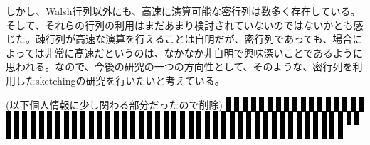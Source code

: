 \documentclass[10pt]{article}
\begin{document}
しかし、Walsh行列以外にも、高速に演算可能な密行列は数多く存在している。そして、それらの行列の利用はまだあまり検討されていないのではないかとも感じた。疎行列が高速な演算を行えることは自明だが、密行列であっても、場合によっては非常に高速だというのは、なかなか非自明で興味深いことであるように思われる。なので、今後の研究の一つの方向性として、そのような、密行列を利用したsketchingの研究を行いたいと考えている。

(以下個人情報に少し関わる部分だったので削除)
\colorbox{black}{--}
\colorbox{black}{--}
\colorbox{black}{--}
\colorbox{black}{--}
\colorbox{black}{--}
\colorbox{black}{--}
\colorbox{black}{--}
\colorbox{black}{--}
\colorbox{black}{--}
\colorbox{black}{--}
\colorbox{black}{--}
\colorbox{black}{--}
\colorbox{black}{--}
\colorbox{black}{--}
\colorbox{black}{--}
\colorbox{black}{--}
\colorbox{black}{--}
\colorbox{black}{--}
\colorbox{black}{--}
\colorbox{black}{--}
\colorbox{black}{--}
\colorbox{black}{--}
\colorbox{black}{--}
\colorbox{black}{--}
\colorbox{black}{--}
\colorbox{black}{--}
\colorbox{black}{--}
\colorbox{black}{--}
\colorbox{black}{--}
\colorbox{black}{--}
\colorbox{black}{--}
\colorbox{black}{--}
\colorbox{black}{--}
\colorbox{black}{--}
\colorbox{black}{--}
\colorbox{black}{--}
\colorbox{black}{--}
\colorbox{black}{--}
\colorbox{black}{--}
\colorbox{black}{--}
\colorbox{black}{--}
\colorbox{black}{--}
\colorbox{black}{--}
\colorbox{black}{--}
\colorbox{black}{--}
\colorbox{black}{--}
\colorbox{black}{--}
\colorbox{black}{--}
\colorbox{black}{--}
\colorbox{black}{--}
\colorbox{black}{--}
\colorbox{black}{--}
\colorbox{black}{--}
\colorbox{black}{--}
\colorbox{black}{--}
\colorbox{black}{--}
\colorbox{black}{--}
\colorbox{black}{--}
\colorbox{black}{--}
\colorbox{black}{--}
\colorbox{black}{--}
\colorbox{black}{--}
\colorbox{black}{--}
\colorbox{black}{--}
\colorbox{black}{--}
\colorbox{black}{--}
\colorbox{black}{--}
\colorbox{black}{--}
\colorbox{black}{--}
\colorbox{black}{--}
\colorbox{black}{--}
\colorbox{black}{--}
\colorbox{black}{--}
\colorbox{black}{--}
\colorbox{black}{--}
\colorbox{black}{--}
\colorbox{black}{--}
\colorbox{black}{--}
\colorbox{black}{--}
\colorbox{black}{--}
\colorbox{black}{--}
\colorbox{black}{--}
\colorbox{black}{--}
\colorbox{black}{--}
\colorbox{black}{--}
\colorbox{black}{--}
\colorbox{black}{--}
\colorbox{black}{--}
\colorbox{black}{--}
\colorbox{black}{--}
\colorbox{black}{--}
\colorbox{black}{--}
\colorbox{black}{--}
\colorbox{black}{--}
\colorbox{black}{--}
\colorbox{black}{--}
\colorbox{black}{--}
\colorbox{black}{--}
\colorbox{black}{--}
\colorbox{black}{--}
\colorbox{black}{--}
\end{document}
